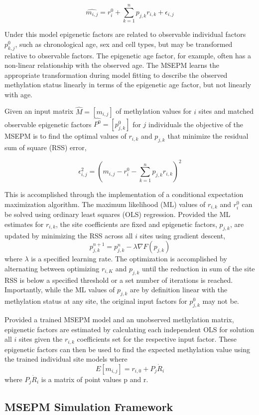 \documentclass[sn-nature]{sn-jnl}
\begin{document}
{\begin{linenumbers}
$$\hat{m_{i,j}} = r^0_i + \sum^n_{k=1} p_{j,k} r_{i,k} + \epsilon_{i,j}$$

Under this model epigenetic factors are related to observable individual 
factors $p_{k,j}^0$, such as chronological age, sex and cell types, but may be transformed relative to observable factors. 
The epigenetic age factor, for example, often has a non-linear relationship with the observed age\cite{Snir2019-ii}. 
The MSEPM learns the appropriate transformation during model fitting to describe the observed methylation status 
linearly in terms of the epigenetic age factor, but not linearly with age.

Given an input matrix $\hat{M} = [m_{i,j}]$ of methylation values for $i$ sites and matched observable epigenetic factors 
$\hat{P^0} = [p_{j,k}^0]$ for $j$ individuals the objective of the MSEPM is to find the optimal values of 
$r_{i,k}$ and $p_{j,k}$ that minimize the  residual sum of square (RSS) error,

$$\epsilon_{i,j}^2 = (m_{i,j} - r^0_{i} - \sum^n_{k=1} p_{j,k} r_{i,k})^2$$ 

This is accomplished through the implementation of a conditional expectation maximization algorithm. The maximum likelihood (ML) values of 
$r_{i,k}$ and $r^0_i$ can
be solved using ordinary least squares (OLS) regression. Provided the ML estimates for $r_{i,k}$, the site coefficients are fixed and 
epigenetic factors, $p_{j,k}$, are  updated by minimizing the RSS across all $i$ sites using 
gradient descent, $$p_{j,k}^{n+1} = p_{j,k}^n - \lambda \nabla F(p_{j,k})$$ where $\lambda$ is a specified learning rate. 
The optimization is accomplished by alternating between optimizing $r_{i,K}$ 
and $p_{j,k}$ until the reduction in sum of the site RSS is below a specified threshold or a set number 
of iterations is reached. Importantly, while the ML values of $p_{j,k}$ are 
by definition linear with the methylation status at any site, the original input factors for $p_{j,k}^0$ may not be. 

Provided a trained MSEPM model and an unobserved methylation matrix, epigenetic factors are estimated by calculating each independent OLS for solution all $i$ 
sites given the $r_{i,k}$ coefficients set for the respective input factor.  These epigenetic factors can then be used to find the expected methylation value 
using the trained individual site models where $$E[m_{i,j}] = r_{i,0} + P_{j} \dot R_{i}$$ where $P_{j} \dot R_{i}$ is a matrix of point values p and r.

\subsection{MSEPM Simulation Framework}


\end{linenumbers}}
\end{document}

